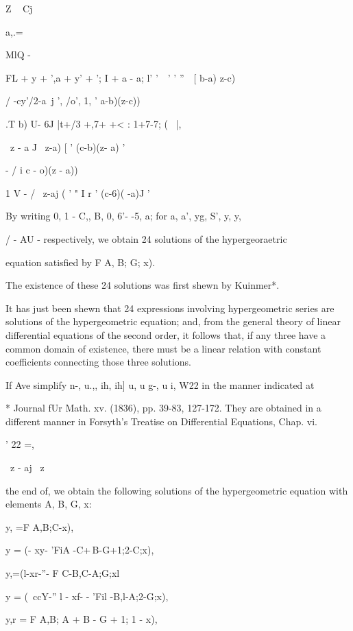 %
%

Z ~ Cj

a,.=

MlQ -

FL + y + ',a + y' + '; I + a - a; l' '\ \ ' ' ''\ \, [ b-a) z-c)

/ -cy'/2-a\ j ', /o', 1, ' a-b)(z-c))

.T b) U- 6J |t+/3 +,7+ +< : 1+7-7; \;( \ |,

\ z - a J \ z-a) [ ' (c-b)(z- a) '

- / i c - o)(z - a))

1 V - / \ z-aj ( ' " I r ' (c-6)( -a)J '

By writing 0, 1 - C,, B, 0, 6'- -5, a; for a, a', yg, S', y, y,

/ - AU - respectively, we obtain 24 solutions of the hypergeoraetric

equation satisfied by F A, B; G; x).

The existence of these 24 solutions was first shewn by Kuinmer*.


It has just been shewn that 24 expressions involving hypergeometric
series are solutions of the hypergeometric equation; and, from the
general theory of linear differential equations of the second order,
it follows that, if any three have a common domain of existence, there
must be a linear relation with constant coefficients connecting those
three solutions.

If Ave simplify n-, u.,, ih, ih] u, u g-, u i, W22 in the manner
indicated at

* Journal fUr Math. xv. (1836), pp. 39-83, 127-172. They are obtained
in a different manner in Forsyth's Treatise on Differential Equations,
Chap. vi.

' 22 =,

\ z - aj \ z

%
%

the end of, we obtain the following solutions of the
hypergeometric equation with elements A, B, G, x:

y, =F A,B;C-x),

y = (- xy- 'FiA -C+\,B-G+1;2-C;x),

y,=(l-xr-''- F C-B,C-A;G;xl

y = (\ ccY-'' l - xf- - 'Fil -B,l-A;2-G;x),

y,r = F A,B; A + B - G + 1; 1 - x),

